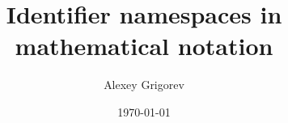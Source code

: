 \title{Identifier namespaces in mathematical notation}
\author{Alexey Grigorev}


\date{\today}
\maketitle


\newpage 


\newpage
\tableofcontents
\newpage